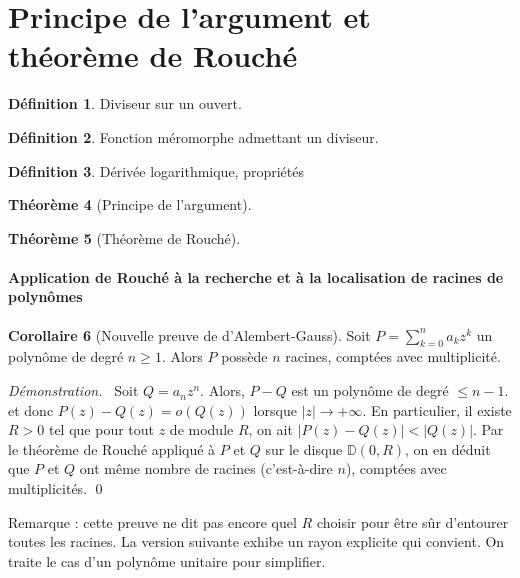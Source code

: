 \documentclass[11pt,a4paper]{book}
\newcommand{\D}{\mathbb{D}}
\theoremstyle{definition}
\newtheorem{theoreme}{Th\'eor\`eme}[section]
\newtheorem{corollaire}[theoreme]{Corollaire}
\renewenvironment{proof}{\color{preuve}\emph{Démonstration.~}}{\qed}
\newtheorem{definition}[theoreme]{D\'efinition}
\theoremstyle{plain}
\begin{document}
\section{Principe de l'argument et théorème de Rouché}

\begin{definition}
Diviseur sur un ouvert.
\end{definition}

\begin{definition}
Fonction méromorphe admettant un diviseur.
\end{definition}

\begin{definition}
Dérivée logarithmique, propriétés
\end{definition}


\begin{theoreme}[Principe de l'argument]

\end{theoreme}

\begin{theoreme}[Théorème de Rouché]
\end{theoreme}


\paragraph{Application de Rouché à la recherche et à la localisation de racines de polynômes}

\begin{corollaire}[Nouvelle preuve de d'Alembert-Gauss]
Soit $P = \sum_{k=0}^n a_kz^k$ un polynôme de degré $n\geq 1$.
Alors $P$ possède $n$ racines, comptées avec multiplicité.
\end{corollaire}
\begin{proof}
Soit $Q=a_nz^n$. Alors, $P-Q$ est un polynôme de degré $\leq n-1$. et donc $P(z)-Q(z) = o(Q(z))$ lorsque $|z|\to +\infty$.
En particulier, il existe $R>0$ tel que pour tout $z$ de module $R$, on ait  $|P(z)-Q(z)| < |Q(z)|$.
Par le théorème de Rouché appliqué à $P$ et $Q$ sur le disque $\D(0,R)$, on en déduit que $P$ et $Q$ ont même nombre de racines (c'est-à-dire $n$), comptées avec multiplicités.
\end{proof}

Remarque : cette preuve ne dit pas encore quel $R$ choisir pour être sûr d'entourer toutes les racines. La version suivante exhibe un rayon explicite qui convient. On traite le cas d'un polynôme unitaire pour simplifier.
\end{document}

